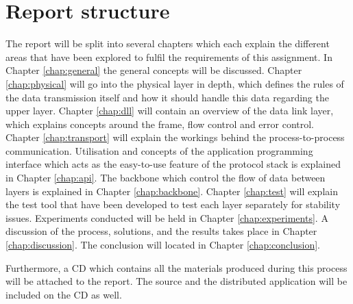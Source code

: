 \section{Report structure}
The report will be split into several chapters which each explain the different areas that have been explored to fulfil the requirements of this assignment. In Chapter \ref{chap:general} the general concepts will be discussed. Chapter \ref{chap:physical} will go into the physical layer in depth, which defines the rules of the data transmission itself and how it should handle this data regarding the upper layer. Chapter \ref{chap:dll} will contain an overview of the data link layer, which explains concepts around the frame, flow control and error control. Chapter \ref{chap:transport} will explain the workings behind the process-to-process communication. Utilisation and concepts of the application programming interface which acts as the easy-to-use feature of the protocol stack is explained in Chapter \ref{chap:api}. The backbone which control the flow of data between layers is explained in Chapter \ref{chap:backbone}. Chapter \ref{chap:test} will explain the test tool that have been developed to test each layer separately for stability issues. Experiments conducted will be held in Chapter \ref{chap:experiments}. A discussion of the process, solutions, and the results takes place in Chapter \ref{chap:discussion}. The conclusion will located in Chapter \ref{chap:conclusion}.

Furthermore, a CD which contains all the materials produced during this process will be attached to the report. The source and the distributed application will be included on the CD as well.